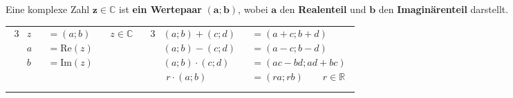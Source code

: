 \parbox{0.9\textwidth}
{
    Eine komplexe Zahl $\mathbf{z \in  \mathbb{C}}$ ist \textbf{ein Wertepaar} $\mathbf{(a; b)}$, wobei $\mathbf{a}$ den \textbf{Realenteil} und $\mathbf{b}$ den \textbf{Imaginärenteil} darstellt.

    \begin{tabular}{c|c}
        \parbox{0.45\textwidth}
        {
            \begin{alignat*}{3}
                &z &&= \left(a; b\right) \qquad z \in \mathbb{C} \\ 
                &a &&= \mbox{Re}(z) \\ 
                &b &&= \mbox{Im}(z) \\
            \end{alignat*}
        }
        &
        \parbox{0.45\textwidth}
        {
            \begin{alignat*}{3}
                &\left(a; b\right) + \left(c; d\right) &&= \left(a + c; b + d\right) \\
                &\left(a; b\right) - \left(c; d\right) &&= \left(a - c; b - d\right) \\
                &\left(a; b\right) \cdot \left(c; d\right) &&= \left(ac - bd; ad + bc\right) \\
                &\,\,r \cdot \left(a; b\right) &&= \left(ra; rb\right) \qquad r \in \mathbb{R} \\
            \end{alignat*}
        }
    \end{tabular}
}
